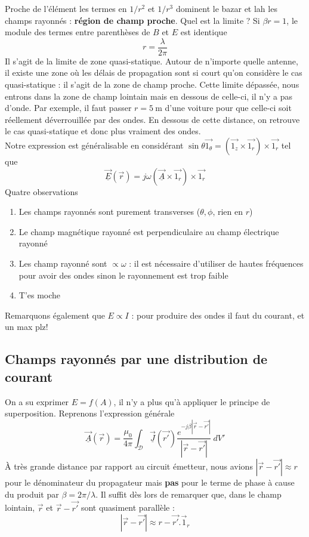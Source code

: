 	Proche de l'élément les termes en $1/r^2$ et $1/r^3$ dominent le bazar et lah les champs 
	rayonnés : \textbf{région de champ proche}. Quel est la limite ? Si $\beta r= 1$, le 
	module des termes entre parenthèses de $B$ et $E$ est identique 
	\begin{equation}
	r = \dfrac{\lambda}{2\pi}
	\end{equation}
	Il s'agit de la limite de zone quasi-statique. Autour de n'importe quelle antenne, il 
	existe une zone où les délais de propagation sont si court qu'on considère le cas 
	quasi-statique : il s'agit de la zone de champ proche. Cette limite dépassée, nous 
	entrons dans la zone de champ lointain mais en dessous de celle-ci, il n'y a pas d'onde.
	Par exemple, il faut passer $r=\SI{5}{\meter}$ d'une voiture pour que celle-ci soit réellement 
	déverrouillée par des ondes. En dessous de cette distance, on retrouve le cas quasi-statique 
	et donc plus vraiment des ondes.\\
	
	Notre expression est généralisable en considérant $
	\sin\theta \vec{1_\theta} = \left(\vec{1_z}\times\vec{1_r}\right)\times\vec{1_r}$ tel que
	\begin{equation}
	\underline{\vec{E}}(\vec{r}) = j\omega\left(\underline{\vec{A}}\times\vec{1_r}\right)\times 
	\vec{1_r}
	\end{equation}
	Quatre observations
	\begin{enumerate}
	\item Les champs rayonnés sont purement transverses ($\theta,\phi$, rien en $r$)
	\item Le champ magnétique rayonné est perpendiculaire au champ électrique rayonné
	\item Les champ rayonné sont $\propto \omega$ : il est nécessaire d'utiliser de hautes 
	fréquences pour avoir des ondes sinon le rayonnement est trop faible
	\item T'es moche
	\end{enumerate}
	Remarquons également que $E\propto I$ : pour produire des ondes il faut du courant, et 
	un max plz!
	
	\subsection{Champs rayonnés par une distribution de courant}
	On a su exprimer $E = f(A)$, il n'y a plus qu'à appliquer le principe de superposition. 
	Reprenons l'expression générale
	\begin{equation}
	\underline{\vec{A}}(\vec{r}) = \dfrac{\mu_0}{4\pi}\int_\mathcal{D}\underline{\vec{J}}(\vec{r'})
	\dfrac{e^{-j\beta|\vec{r}-\vec{r'}|}}{|\vec{r}-\vec{r'}|}\ dV'
	\end{equation}
	À très grande distance par rapport au circuit émetteur, nous avions $|\vec{r}-\vec{r'}|
	\approx r$ pour le dénominateur du propagateur mais \textbf{pas} pour le terme de phase 
	à cause du produit par $\beta = 2\pi/\lambda$. Il suffit dès lors de remarquer que, dans le 
	champ lointain, $\vec{r}$ et $\vec{r}-\vec{r'}$ sont quasiment parallèle :
	\begin{equation}
	|\vec{r}-\vec{r'}| \approx r - \vec{r'}.\vec{1}_r
	\end{equation}

